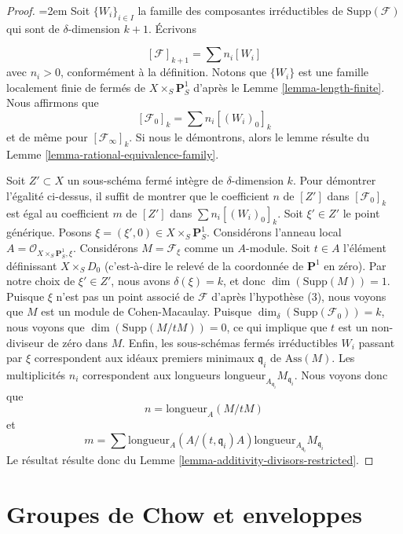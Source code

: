 \begin{proof}
{\emergencystretch=2em Soit $\{W_i\}_{i \in I}$ la famille des composantes
irréductibles de $\text{Supp}(\mathcal{F})$
qui sont de $\delta$-dimension $k + 1$.
Écrivons\par}
$$
[\mathcal{F}]_{k + 1} = \sum n_i[W_i]
$$
avec $n_i > 0$, conformément à la définition. Notons que $\{W_i\}$
est une famille localement finie de fermés de
$X \times_S \mathbf{P}^1_S$ d'après le Lemme \ref{lemma-length-finite}.
Nous affirmons que
$$
[\mathcal{F}_0]_k = \sum n_i[(W_i)_0]_k
$$
et de même pour $[\mathcal{F}_\infty]_k$. Si nous le démontrons, alors le lemme
résulte du Lemme \ref{lemma-rational-equivalence-family}.

\medskip\noindent
Soit $Z' \subset X$ un sous-schéma fermé intègre de $\delta$-dimension $k$.
Pour démontrer l'égalité ci-dessus, il suffit de montrer que le coefficient $n$
de $[Z']$ dans $[\mathcal{F}_0]_k$ est égal au coefficient $m$ de
$[Z']$ dans $\sum n_i[(W_i)_0]_k$. Soit $\xi' \in Z'$ le point générique.
Posons $\xi = (\xi', 0) \in  X \times_S \mathbf{P}^1_S$.
Considérons l'anneau local $A = \mathcal{O}_{X \times_S \mathbf{P}^1_S, \xi}$.
Considérons $M = \mathcal{F}_\xi$ comme un $A$-module.
Soit $t \in A$ l'élément définissant $X \times_S D_0$
(c'est-à-dire le relevé de la coordonnée de $\mathbf{P}^1$ en zéro).
Par notre choix de $\xi' \in Z'$, nous avons $\delta(\xi) = k$,
et donc $\dim(\text{Supp}(M)) = 1$. Puisque $\xi$ n'est pas un point associé
de $\mathcal{F}$ d'après l'hypothèse (3), nous voyons que $M$ est un module de Cohen-Macaulay.
Puisque $\dim_\delta(\text{Supp}(\mathcal{F}_0)) = k$,
nous voyons que $\dim(\text{Supp}(M/tM)) = 0$, ce qui implique que $t$
est un non-diviseur de zéro dans $M$. Enfin, les sous-schémas fermés irréductibles
$W_i$ passant par $\xi$ correspondent aux idéaux premiers minimaux
$\mathfrak q_i$ de $\text{Ass}(M)$. Les multiplicités $n_i$ correspondent
aux longueurs $\text{longueur}_{A_{\mathfrak q_i}}M_{\mathfrak q_i}$.
Nous voyons donc que
$$
n = \text{longueur}_A(M/tM)
$$
et
$$
m = \sum
\text{longueur}_A(A/(t, \mathfrak q_i)A)
\text{longueur}_{A_{\mathfrak q_i}}M_{\mathfrak q_i}
$$
Le résultat résulte donc du
Lemme \ref{lemma-additivity-divisors-restricted}.
\end{proof}







\section{Groupes de Chow et enveloppes}
\label{section-envelopes}

